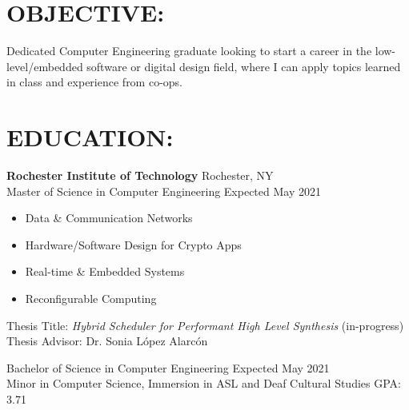 \documentclass[line,margin]{res}
\begin{document}
\setlength\columnsep{-30pt}
\email{} %
\phone{} %
\address{} %
\address{} %
\website{} %

\begin{resume}
	 \setlength
	 \multicolsep{2pt}

	\section{OBJECTIVE:} %
		Dedicated Computer Engineering graduate looking to start a career in the low-level/embedded software or digital design field, where I can apply topics learned in class and experience from co-ops. 

	\section{EDUCATION:} 
		\textbf{Rochester Institute of Technology} \hfill Rochester, NY\\
		Master of Science in Computer Engineering \hfill Expected May 2021 
		\begin{multicols}{2}
			\setlength\columnsep{1pt}
			\begin{itemize}
				\setlength{\itemindent}{-10pt}
				\item[] Data \& Communication Networks
				\item[] Hardware/Software Design for Crypto Apps
				\item[] \hspace{10pt} Real-time \& Embedded Systems
				\item[] \hspace{10pt} Reconfigurable Computing
			\end{itemize}
		\end{multicols}
		\vspace{-11pt}
		Thesis Title: \textit{Hybrid Scheduler for Performant High Level Synthesis} (in-progress) \\
		Thesis Advisor: Dr. Sonia L\'opez Alarc\'on 
		\vspace{-4pt}

		Bachelor of Science in Computer Engineering \hfill Expected May 2021\\ 
		Minor in Computer Science, Immersion in ASL and Deaf Cultural Studies \hfill GPA: 3.71


\end{resume}
\end{document}
